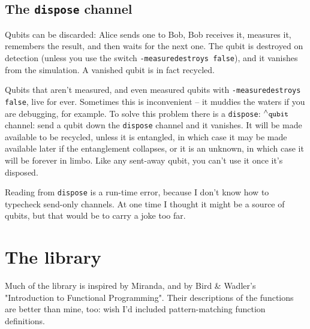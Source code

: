 \documentclass[11pt,a4paper]{book}
\newcommand{\verbtt}[1]{\texttt{\small{}#1}}
\newcommand{\caret}[0]{\ensuremath{{}^{\wedge}}}
\begin{document}
\section{The \verbtt{dispose} channel}

Qubits can be discarded: Alice sends one to Bob, Bob receives it, measures it, remembers the result, and then waits for the next one. The qubit is destroyed on detection (unless you use the switch \verbtt{-measuredestroys false}), and it vanishes from the simulation. A vanished qubit is in fact recycled.

Qubits that aren't measured, and even measured qubits with \verbtt{-measuredestroys false}, live for ever. Sometimes this is inconvenient -- it muddies the waters if you are debugging, for example. To solve this problem there is a \verbtt{dispose}: $\caret{}\verbtt{qubit}$ channel: send a qubit down the \verbtt{dispose} channel and it vanishes. It will be made available to be recycled, unless it is entangled, in which case it may be made available later if the entanglement collapses, or it is an unknown, in which case it will be forever in limbo. Like any sent-away qubit, you can't use it once it's disposed.

Reading from \verbtt{dispose} is a run-time error, because I don't know how to typecheck send-only channels. At one time I thought it might be a source of qubits, but that would be to carry a joke too far.

\chapter{The library}

\newenvironment{explain}{\list{}{}\item\relax}{\endlist}
\newcommand{\libitem}[2]{\hspace{10pt}\verbtt{#1}\vspace{-\topsep}\vspace{-\parskip}\begin{explain}#2\vspace{-\parskip}\end{explain}}
\newcommand{\libitemS}[1]{\libitem{#1}{\mbox{}\vspace{-\topsep}\vspace{-\topsep}}}
Much of the library is inspired by Miranda, and by Bird \& Wadler's "Introduction to Functional Programming". Their descriptions of the functions are better than mine, too: wish I'd included pattern-matching function definitions.
\end{document}
